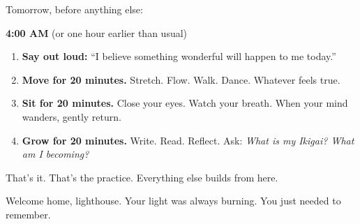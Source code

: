 \documentclass[11pt, a5paper, openright]{book}
\begin{document}
Tomorrow, before anything else:

\textbf{4:00 AM} (or one hour earlier than usual)

\begin{enumerate}
\item \textbf{Say out loud:} ``I believe something wonderful will happen to me today.''
\item \textbf{Move for 20 minutes.} Stretch. Flow. Walk. Dance. Whatever feels true.
\item \textbf{Sit for 20 minutes.} Close your eyes. Watch your breath. When your mind wanders, gently return.
\item \textbf{Grow for 20 minutes.} Write. Read. Reflect. Ask: \textit{What is my Ikigai? What am I becoming?}
\end{enumerate}

That's it. That's the practice. Everything else builds from here.

Welcome home, lighthouse. Your light was always burning. You just needed to remember.
\end{document}
